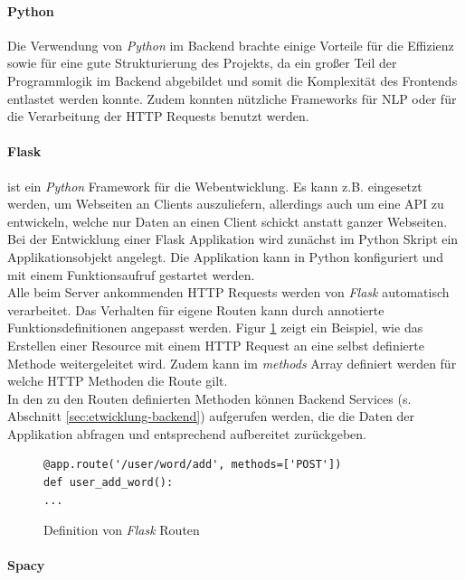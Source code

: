\paragraph{Python}
\label{sec:python}

Die Verwendung von \textit{Python}\cite{vanRossum2011} im Backend brachte einige Vorteile für die Effizienz sowie für eine gute Strukturierung des Projekts, da ein großer Teil der Programmlogik im Backend abgebildet und somit die Komplexität des Frontends entlastet werden konnte. Zudem konnten nützliche Frameworks für NLP oder für die Verarbeitung der HTTP Requests benutzt werden.

\paragraph{Flask}
\label{sec:flask}

ist ein \textit{Python} Framework für die Webentwicklung. Es kann z.B. eingesetzt werden, um Webseiten an Clients auszuliefern, allerdings auch um eine API zu entwickeln, welche nur Daten an einen Client schickt anstatt ganzer Webseiten\cite{Grinberg:2014:FWD:2621997}. Bei der Entwicklung einer Flask Applikation wird zunächst im Python Skript ein Applikationsobjekt angelegt. Die Applikation kann in Python konfiguriert und mit einem Funktionsaufruf gestartet werden.\\
Alle beim Server ankommenden HTTP Requests werden von \textit{Flask} automatisch verarbeitet. Das Verhalten für eigene Routen kann durch annotierte Funktionsdefinitionen angepasst werden. Figur \ref{fig:flask} zeigt ein Beispiel, wie das Erstellen einer Resource mit einem HTTP Request an eine selbst definierte Methode weitergeleitet wird. Zudem kann im \textit{methods} Array definiert werden für welche HTTP Methoden die Route gilt.\\
In den zu den Routen definierten Methoden können Backend Services (s. Abschnitt \ref{sec:etwicklung-backend}) aufgerufen werden, die die Daten der Applikation abfragen und entsprechend aufbereitet zurückgeben. 

\begin{figure}
	\begin{lstlisting}
@app.route('/user/word/add', methods=['POST'])
def user_add_word():
...
	\end{lstlisting}
	\caption{Definition von \textit{Flask} Routen}
	\label{fig:flask}
\end{figure}

\paragraph{Spacy}
\label{sec:spacy}

